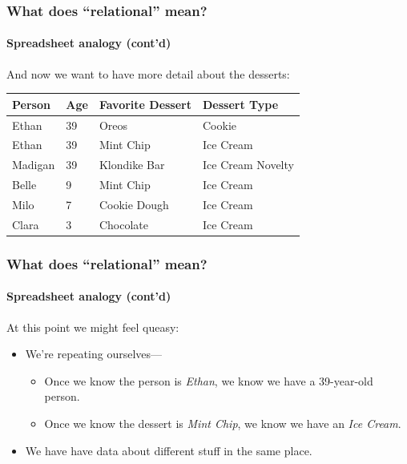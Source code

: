 \documentclass[aspectratio=169]{beamer}
\begin{document}
\begin{frame}
  \frametitle{What does ``relational'' mean?}
  \framesubtitle{Spreadsheet analogy (cont'd)}

  And now we want to have more detail about the desserts:

  \begin{table}[]
    \small
    \begin{tabular}{@{}llll@{}}
      \toprule
      Person  & Age & Favorite Dessert & Dessert Type      \\ \midrule
      Ethan   & 39  & Oreos            & Cookie            \\
      Ethan   & 39  & Mint Chip        & Ice Cream         \\
      Madigan & 39  & Klondike Bar     & Ice Cream Novelty \\
      Belle   & 9   & Mint Chip        & Ice Cream         \\
      Milo    & 7   & Cookie Dough     & Ice Cream         \\
      Clara   & 3   & Chocolate        & Ice Cream         \\ \bottomrule
    \end{tabular}
  \end{table}
\end{frame}

\begin{frame}
  \frametitle{What does ``relational'' mean?}
  \framesubtitle{Spreadsheet analogy (cont'd)}

  At this point we might feel queasy:
  \begin{itemize}
    \item We're repeating ourselves---
          \begin{itemize}
            \item Once we know the person is \textit{Ethan}, we know we have
                  a 39-year-old person.
            \item Once we know the dessert is \textit{Mint Chip}, we know we
                  have an \textit{Ice Cream}.
          \end{itemize}
    \item We have have data about different stuff in the same place.
  \end{itemize}
\end{frame}
\end{document}
